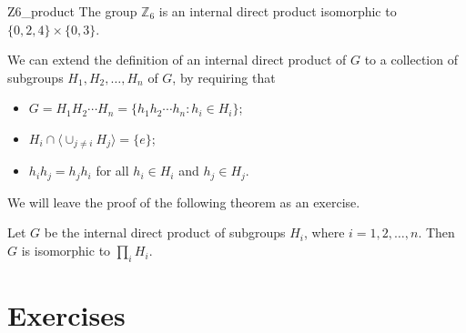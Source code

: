  
\begin{example}{Z6_product}
The group ${\mathbb Z}_6$ is an internal direct product isomorphic to $\{
0, 2, 4\} \times \{ 0, 3 \}$. 
\end{example}

 
We can extend the definition of an internal direct product of $G$ to a
collection of subgroups $H_1, H_2, \ldots, H_n$ of $G$, by requiring
that 
\begin{itemize}
 
\item
$G = H_1 H_2 \cdots H_n = \{ h_1 h_2 \cdots h_n : h_i \in H_i \}$;
 
\item
$H_i \cap \langle \cup_{j \neq i} H_j \rangle = \{ e \}$;
 
\item
$h_i h_j = h_j h_i$ for all $h_i \in H_i$ and $h_j \in H_j$.
 
\end{itemize}
We will leave the proof of the following theorem as an exercise. 
 
\begin{theorem}
Let $G$ be the internal direct product of subgroups $H_i$, where $i =
1, 2, \ldots, n$. Then $G$ is isomorphic to $\prod_i H_i$. 
\end{theorem}

 


 
\section*{Exercises}
\exrule

 
 
